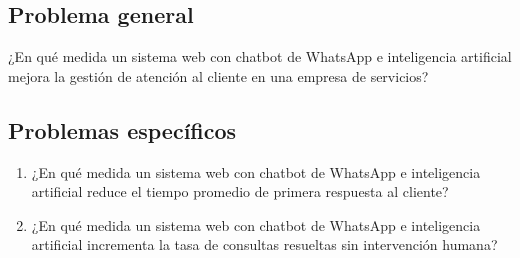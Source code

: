 \subsection{Problema general}
¿En qué medida un sistema web con chatbot de WhatsApp e inteligencia artificial mejora la gestión de atención al cliente en una empresa de servicios?

\subsection{Problemas específicos}
\begin{enumerate}[label=\textbf{PE\arabic*:},leftmargin=1.27cm,itemsep=4pt]
\item ¿En qué medida un sistema web con chatbot de WhatsApp e inteligencia artificial reduce el tiempo promedio de primera respuesta al cliente?
\item ¿En qué medida un sistema web con chatbot de WhatsApp e inteligencia artificial incrementa la tasa de consultas resueltas sin intervención humana?
\end{enumerate}
